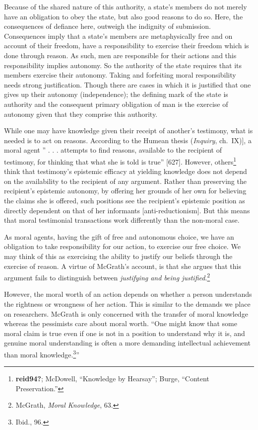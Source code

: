 \documentclass[phdthesis,12pt,final]{wuthesis}
\theoremstyle{definition}
\theoremstyle{definition}
\theoremstyle{definition}
\theoremstyle{definition}
\theoremstyle{remark}
\begin{document}
Because of the shared nature of this authority, a state's members do not merely have an obligation to obey the state, but also good reasons to do so. Here, the consequences of defiance here, outweigh the indignity of submission. Consequences imply that a state's members are metaphysically free and on account of their freedom, have a responsibility to exercise their freedom which is done through reason. As such, men are responsible for their actions and this responsibility implies autonomy. So the authority of the state requires that its members exercise their autonomy. Taking and forfeiting moral responsibility needs strong justification. Though there are cases in which it is justified that one gives up their autonomy (independence); the defining mark of the state is authority and the consequent primary obligation of man is the exercise of autonomy given that they comprise this authority.

While one may have knowledge given their receipt of another's testimony, what is needed is to act on reasons. According to the Humean thesis (\emph{Inquiry}, ch.~IX){]}, a moral agent '' . . . attempts to find reasons, available to the recipient of testimony, for thinking that what she is told is true'' {[}627{]}. However, others\footnote{\textbf{reid94?}; McDowell, {``Knowledge by {Hearsay}''}; Burge, {``Content {Preservation}.''}} think that testimony's epistemic efficacy at yielding knowledge does not depend on the availability to the recipient of any argument. Rather than preserving the recipient's epistemic autonomy, by offering her grounds of her own for believing the claims she is offered, such positions see the recipient's epistemic position as directly dependent on that of her informants {[}anti-reductionism{]}. But this means that moral testimonial transactions work differently than the non-moral case.

As moral agents, having the gift of free and autonomous choice, we have an obligation to take responsibility for our action, to exercise our free choice. We may think of this as exercising the ability to justify our beliefs through the exercise of reason. A virtue of McGrath's account, is that she argues that this argument fails to distinguish between \emph{justifying and being justified}.\footnote{McGrath, \emph{Moral {Knowledge}}, 63.}

However, the moral worth of an action depends on whether a person understands the rightness or wrongness of her action. This is similar to the demands we place on researchers. McGrath is only concerned with the transfer of moral knowledge whereas the pessimists care about moral worth. ``One might know that some moral claim is true even if one is not in a position to understand why it is, and genuine moral understanding is often a more demanding intellectual achievement than moral knowledge.\footnote{Ibid., 96.}''
\end{document}

